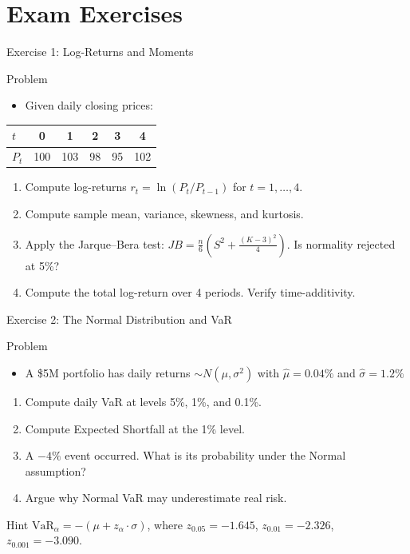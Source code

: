 \documentclass[9pt, aspectratio=169, t]{beamer}
\theoremstyle{definition}
\begin{document}
\section{Exam Exercises}

\begin{frame}{Exercise 1: Log-Returns and Moments}
\begin{block}{Problem}
\begin{itemize}
\item Given daily closing prices:
\end{itemize}
\begin{center}
{\small
\renewcommand{\arraystretch}{1.2}
\begin{tabular}{lccccc}
\toprule
$t$ & 0 & 1 & 2 & 3 & 4 \\
\midrule
$P_t$ & 100 & 103 & 98 & 95 & 102 \\
\bottomrule
\end{tabular}
}
\end{center}
\end{block}
\begin{enumerate}
    \item Compute log-returns $r_t = \ln(P_t/P_{t-1})$ for $t = 1, \ldots, 4$.
    \item Compute sample mean, variance, skewness, and kurtosis.
    \item Apply the Jarque--Bera test: $JB = \frac{n}{6}\left(S^2 + \frac{(K-3)^2}{4}\right)$. Is normality rejected at 5\%?
    \item Compute the total log-return over 4 periods. Verify time-additivity.
\end{enumerate}
\end{frame}

\begin{frame}{Exercise 2: The Normal Distribution and VaR}
\begin{block}{Problem}
\begin{itemize}
\item A \$5M portfolio has daily returns $\sim N(\mu, \sigma^2)$ with $\hat{\mu} = 0.04\%$ and $\hat{\sigma} = 1.2\%$
\end{itemize}
\end{block}
\begin{enumerate}
    \item Compute daily VaR at levels 5\%, 1\%, and 0.1\%.
    \item Compute Expected Shortfall at the 1\% level.
    \item A $-4\%$ event occurred. What is its probability under the Normal assumption?
    \item Argue why Normal VaR may underestimate real risk.
\end{enumerate}
\vspace{0.1cm}
\begin{exampleblock}{Hint}
$\text{VaR}_\alpha = -(\mu + z_\alpha \cdot \sigma)$, where $z_{0.05} = -1.645$, $z_{0.01} = -2.326$, $z_{0.001} = -3.090$.
\end{exampleblock}
\end{frame}
\end{document}
